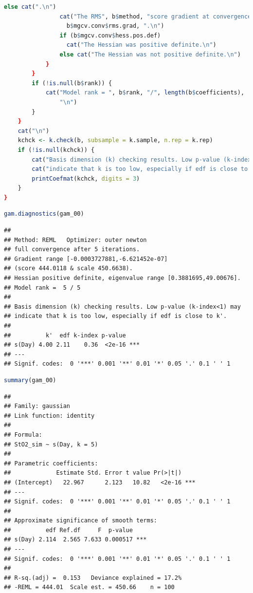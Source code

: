 \documentclass[
]{article}
\begin{document}
\begin{lstlisting}[language=R]
                else cat(".\n")
                cat("The RMS", b$method, "score gradient at convergence was", 
                  b$mgcv.conv$rms.grad, ".\n")
                if (b$mgcv.conv$hess.pos.def) 
                  cat("The Hessian was positive definite.\n")
                else cat("The Hessian was not positive definite.\n")
            }
        }
        if (!is.null(b$rank)) {
            cat("Model rank = ", b$rank, "/", length(b$coefficients), 
                "\n")
        }
    }
    cat("\n")
    kchck <- k.check(b, subsample = k.sample, n.rep = k.rep)
    if (!is.null(kchck)) {
        cat("Basis dimension (k) checking results. Low p-value (k-index<1) may\n")
        cat("indicate that k is too low, especially if edf is close to k'.\n\n")
        printCoefmat(kchck, digits = 3)
    }
}
\end{lstlisting}

\begin{lstlisting}[language=R]
gam.diagnostics(gam_00)
\end{lstlisting}

\begin{lstlisting}
## 
## Method: REML   Optimizer: outer newton
## full convergence after 5 iterations.
## Gradient range [-0.0003727881,-6.621452e-07]
## (score 444.0118 & scale 450.6638).
## Hessian positive definite, eigenvalue range [0.3881695,49.00676].
## Model rank =  5 / 5 
## 
## Basis dimension (k) checking results. Low p-value (k-index<1) may
## indicate that k is too low, especially if edf is close to k'.
## 
##          k'  edf k-index p-value    
## s(Day) 4.00 2.11    0.36  <2e-16 ***
## ---
## Signif. codes:  0 '***' 0.001 '**' 0.01 '*' 0.05 '.' 0.1 ' ' 1
\end{lstlisting}

\begin{lstlisting}[language=R]
summary(gam_00)
\end{lstlisting}

\begin{lstlisting}
## 
## Family: gaussian 
## Link function: identity 
## 
## Formula:
## StO2_sim ~ s(Day, k = 5)
## 
## Parametric coefficients:
##             Estimate Std. Error t value Pr(>|t|)    
## (Intercept)   22.967      2.123   10.82   <2e-16 ***
## ---
## Signif. codes:  0 '***' 0.001 '**' 0.01 '*' 0.05 '.' 0.1 ' ' 1
## 
## Approximate significance of smooth terms:
##          edf Ref.df     F  p-value    
## s(Day) 2.114  2.565 7.633 0.000517 ***
## ---
## Signif. codes:  0 '***' 0.001 '**' 0.01 '*' 0.05 '.' 0.1 ' ' 1
## 
## R-sq.(adj) =  0.153   Deviance explained = 17.2%
## -REML = 444.01  Scale est. = 450.66    n = 100
\end{lstlisting}
\end{document}
